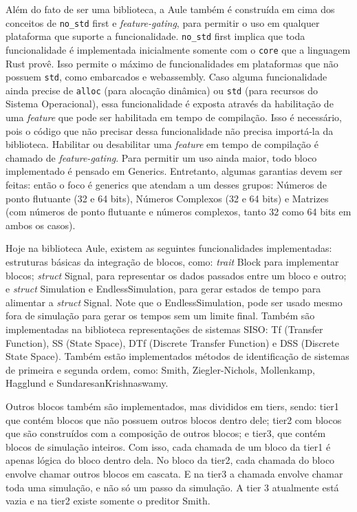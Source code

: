 Além do fato de ser uma biblioteca, a Aule também é construída em cima dos conceitos de \texttt{no\_std} first e \textit{feature-gating}, para permitir o uso em qualquer plataforma que suporte a funcionalidade. \texttt{no\_std} first implica que toda funcionalidade é implementada inicialmente somente com o \texttt{core} que a linguagem Rust provê. Isso permite o máximo de funcionalidades em plataformas que não possuem \texttt{std}, como embarcados e webassembly. Caso alguma funcionalidade ainda precise de \texttt{alloc} (para alocação dinâmica) ou \texttt{std} (para recursos do Sistema Operacional), essa funcionalidade é exposta através da habilitação de uma \textit{feature} que pode ser habilitada em tempo de compilação. Isso é necessário, pois o código que não precisar dessa funcionalidade não precisa importá-la da biblioteca. Habilitar ou desabilitar uma \textit{feature} em tempo de compilação é chamado de \textit{feature-gating}. Para permitir um uso ainda maior, todo bloco implementado é pensado em Generics. Entretanto, algumas garantias devem ser feitas: então o foco é generics que atendam a um desses grupos: Números de ponto flutuante (32 e 64 bits), Números Complexos (32 e 64 bits) e Matrizes (com números de ponto flutuante e números complexos, tanto 32 como 64 bits em ambos os casos).

Hoje na biblioteca Aule, existem as seguintes funcionalidades implementadas: estruturas básicas da integração de blocos, como: \textit{trait} Block para implementar blocos; \textit{struct} Signal, para representar os dados passados entre um bloco e outro; e \textit{struct} Simulation e EndlessSimulation, para gerar estados de tempo para alimentar a \textit{struct} Signal. Note que o EndlessSimulation, pode ser usado mesmo fora de simulação para gerar os tempos sem um limite final. Também são implementadas na biblioteca representações de sistemas \ac{SISO}: Tf (Transfer Function), SS (State Space), DTf (Discrete Transfer Function) e DSS (Discrete State Space). Também estão implementados métodos de identificação de sistemas de primeira e segunda ordem, como: Smith, Ziegler-Nichols, Mollenkamp, Hagglund e SundaresanKrishnaswamy.

Outros blocos também são implementados, mas divididos em tiers, sendo: tier1 que contém blocos que não possuem outros blocos dentro dele; tier2 com blocos que são construídos com a composição de outros blocos; e tier3, que contém blocos de simulação inteiros. Com isso, cada chamada de um bloco da tier1 é apenas lógica do bloco dentro dela. No bloco da tier2, cada chamada do bloco envolve chamar outros blocos em cascata. E na tier3 a chamada envolve chamar toda uma simulação, e não só um passo da simulação. A tier 3 atualmente está vazia e na tier2 existe somente o preditor Smith.

